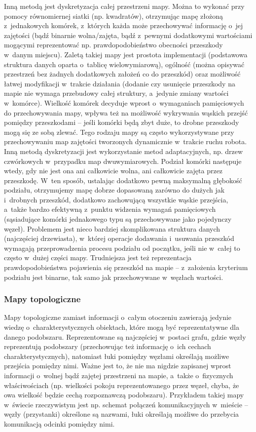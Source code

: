Inną metodą jest dyskretyzacja całej przestrzeni mapy. Można to wykonać przy pomocy
równomiernej siatki (np. kwadratów), otrzymując mapę złożoną z~jednakowych komórek,
z~których każda może przechowywać informację o~jej zajętości (bądź binarnie wolna/zajęta,
bądź z~pewnymi dodatkowymi wartościami mogącymi reprezentować np. prawdopodobieństwo
obecności przeszkody w~danym miejscu). Zaletą takiej mapy jest prostota implementacji
(podstawowa struktura danych oparta o~tablicę wielowymiarową), ogólność (można opisywać
przestrzeń bez żadnych dodatkowych założeń co do przeszkód) oraz możliwość łatwej modyfikacji
w~trakcie działania (dodanie czy usunięcie przeszkody na mapie nie wymaga przebudowy
całej struktury, a~jedynie zmiany wartości w~komórce). Wielkość komórek decyduje wprost
o~wymaganiach pamięciowych do przechowywania mapy, wpływa też na możliwość
wykrywania wąskich przejść pomiędzy przeszkodami -- jeśli komórki będą zbyt duże, to
drobne przeszkody mogą się ze sobą zlewać. Tego rodzaju mapy są często wykorzystywane
przy przechowywaniu map zajętości tworzonych dynamicznie w~trakcie ruchu robota.
Inną metodą dyskretyzacji jest wykorzystanie metod adaptacyjnych, np. drzew czwórkowych
w~przypadku map dwuwymiarowych. Podział komórki następuje wtedy, gdy nie jest ona
ani całkowicie wolna, ani całkowicie zajęta przez przeszkodę. W~ten sposób, ustalając
dodatkowo pewną maksymalną głębokość podziału, otrzymujemy mapę dobrze dopasowaną
zarówno do dużych jak i~drobnych przeszkód, dodatkowo zachowującą wszystkie wąskie
przejścia, a~także bardzo efektywną z~punktu widzenia wymagań pamięciowych (sąsiadujące
komórki jednakowego typu są przechowywane jako pojedynczy węzeł). Problemem jest
nieco bardziej skomplikowana struktura danych (najczęściej drzewiasta), w~której
operacje dodawania i~usuwania przeszkód wymagają przeprowadzenia procesu podziału
od początku, jeśli nie w~całej to często w~dużej części mapy. Trudniejsza jest też
reprezentacja prawdopodobieństwa pojawienia się przeszkód na mapie -- z~założenia kryterium
podziału jest binarne, tak samo jak przechowywane w~węzłach wartości.

\subsubsection{Mapy topologiczne}

Mapy topologiczne zamiast informacji o~całym otoczeniu zawierają jedynie wiedzę 
o~charakterystycznych obiektach, które mogą być reprezentatywne dla danego podobszaru.
Reprezentowane są najczęściej w~postaci grafu, gdzie węzły reprezentują podobszary
(przechowując też informację o~ich cechach charakterystycznych), natomiast łuki
pomiędzy węzłami określają możliwe przejścia pomiędzy nimi. Ważne jest to, że nie
ma nigdzie zapisanej wprost informacji o~wolnej bądź zajętej przestrzeni na mapie,
a~także o~fizycznych właściwościach (np. wielkości pokoju reprezentowanego przez węzeł,
chyba, że owa wielkość będzie cechą rozpoznawczą podobszaru). Przykładem takiej mapy
w~świecie rzeczywistym jest np. schemat połączeń komunikacyjnych w~mieście -- węzły (przystanki)
określone są nazwami, łuki określają możliwe do przebycia komunikacją odcinki pomiędzy
nimi.

